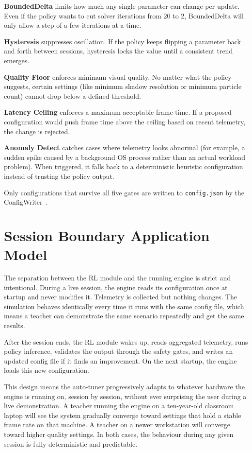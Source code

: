 \documentclass[9pt,openany]{extbook}
\begin{document}
\textbf{BoundedDelta} limits how much any single parameter can change per update. Even if the policy wants to cut solver iterations from 20 to 2, BoundedDelta will only allow a step of a few iterations at a time.

\textbf{Hysteresis} suppresses oscillation. If the policy keeps flipping a parameter back and forth between sessions, hysteresis locks the value until a consistent trend emerges.

\textbf{Quality Floor} enforces minimum visual quality. No matter what the policy suggests, certain settings (like minimum shadow resolution or minimum particle count) cannot drop below a defined threshold.

\textbf{Latency Ceiling} enforces a maximum acceptable frame time. If a proposed configuration would push frame time above the ceiling based on recent telemetry, the change is rejected.

\textbf{Anomaly Detect} catches cases where telemetry looks abnormal (for example, a sudden spike caused by a background OS process rather than an actual workload problem). When triggered, it falls back to a deterministic heuristic configuration instead of trusting the policy output.

Only configurations that survive all five gates are written to \texttt{config.json} by the ConfigWriter~\cite{cpo, safe_rl_survey}.


\section{Session Boundary Application Model}

The separation between the RL module and the running engine is strict and intentional. During a live session, the engine reads its configuration once at startup and never modifies it. Telemetry is collected but nothing changes. The simulation behaves identically every time it runs with the same config file, which means a teacher can demonstrate the same scenario repeatedly and get the same results.

After the session ends, the RL module wakes up, reads aggregated telemetry, runs policy inference, validates the output through the safety gates, and writes an updated config file if it finds an improvement. On the next startup, the engine loads this new configuration.

This design means the auto-tuner progressively adapts to whatever hardware the engine is running on, session by session, without ever surprising the user during a live demonstration. A teacher running the engine on a ten-year-old classroom laptop will see the system gradually converge toward settings that hold a stable frame rate on that machine. A teacher on a newer workstation will converge toward higher quality settings. In both cases, the behaviour during any given session is fully deterministic and predictable.
\end{document}

